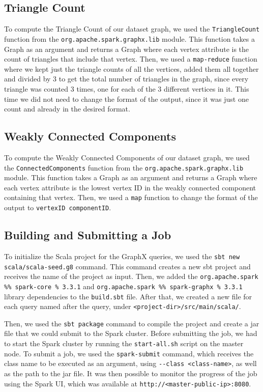 \documentclass[conference]{IEEEtran}
\begin{document}
\subsection{Triangle Count}

To compute the Triangle Count of our dataset graph, we used the \verb|TriangleCount| function from the \verb|org.apache.spark.graphx.lib| module. This function takes a Graph as an argument and returns a Graph where each vertex attribute is the count of triangles that include that vertex. Then, we used a \verb|map-reduce| function where we kept just the triangle counts of all the vertices, added them all together and divided by 3 to get the total number of triangles in the graph, since every triangle was counted 3 times, one for each of the 3 different vertices in it. This time we did not need to change the format of the output, since it was just one count and already in the desired format.

\subsection{Weakly Connected Components}

To compute the Weakly Connected Components of our dataset graph, we used the \verb|ConnectedComponents| function from the \verb|org.apache.spark.graphx.lib| module. This function takes a Graph as an argument and returns a Graph where each vertex attribute is the lowest vertex ID in the weakly connected component containing that vertex. Then, we used a \verb|map| function to change the format of the output to \verb|vertexID componentID|.

\subsection{Building and Submitting a Job}

To initialize the Scala project for the GraphX queries, we used the \verb|sbt new scala/scala-seed.g8| command. This command creates a new sbt project and receives the name of the project as input. Then, we added the \verb|org.apache.spark %% spark-core % 3.3.1| and \verb|org.apache.spark %% spark-graphx % 3.3.1| library dependencies to the \verb|build.sbt| file. After that, we created a new file for each query named after the query, under \verb|<project-dir>/src/main/scala/|.

Then, we used the \verb|sbt package| command to compile the project and create a jar file that we could submit to the Spark cluster. Before submitting the job, we had to start the Spark cluster by running the \verb|start-all.sh| script on the master node. To submit a job, we used the \verb|spark-submit| command, which receives the class name to be executed as an argument, using \verb|--class <class-name>|, as well as the path to the jar file. It was then possible to monitor the progress of the job using the Spark UI, which was available at \verb|http://<master-public-ip>:8080|.
\end{document}
